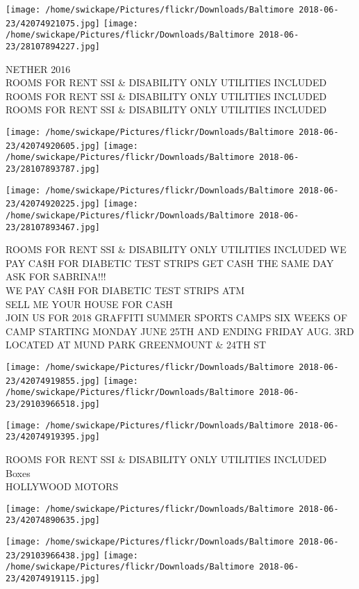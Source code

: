 \documentclass[10pt,letterpaper]{article}
\begin{document}
\texttt{[image: /home/swickape/Pictures/flickr/Downloads/Baltimore 2018-06-23/42074921075.jpg]}
\texttt{[image: /home/swickape/Pictures/flickr/Downloads/Baltimore 2018-06-23/28107894227.jpg]}

NETHER 2016\\
ROOMS FOR RENT SSI \& DISABILITY ONLY UTILITIES INCLUDED\\
ROOMS FOR RENT SSI \& DISABILITY ONLY UTILITIES INCLUDED\\
ROOMS FOR RENT SSI \& DISABILITY ONLY UTILITIES INCLUDED
\pagebreak

\texttt{[image: /home/swickape/Pictures/flickr/Downloads/Baltimore 2018-06-23/42074920605.jpg]}
\texttt{[image: /home/swickape/Pictures/flickr/Downloads/Baltimore 2018-06-23/28107893787.jpg]}

\texttt{[image: /home/swickape/Pictures/flickr/Downloads/Baltimore 2018-06-23/42074920225.jpg]}
\texttt{[image: /home/swickape/Pictures/flickr/Downloads/Baltimore 2018-06-23/28107893467.jpg]}

ROOMS FOR RENT SSI \& DISABILITY ONLY UTILITIES INCLUDED WE PAY CA\$H FOR DIABETIC TEST STRIPS GET CASH THE SAME DAY ASK FOR SABRINA!!!\\
WE PAY CA\$H FOR DIABETIC TEST STRIPS ATM\\
SELL ME YOUR HOUSE FOR CASH\\
JOIN US FOR 2018 GRAFFITI SUMMER SPORTS CAMPS SIX WEEKS OF CAMP STARTING MONDAY JUNE 25TH AND ENDING FRIDAY AUG. 3RD LOCATED AT MUND PARK GREENMOUNT \& 24TH ST
\pagebreak

\texttt{[image: /home/swickape/Pictures/flickr/Downloads/Baltimore 2018-06-23/42074919855.jpg]}
\texttt{[image: /home/swickape/Pictures/flickr/Downloads/Baltimore 2018-06-23/29103966518.jpg]}

\texttt{[image: /home/swickape/Pictures/flickr/Downloads/Baltimore 2018-06-23/42074919395.jpg]}

ROOMS FOR RENT SSI \& DISABILITY ONLY UTILITIES INCLUDED\\
Boxes\\
HOLLYWOOD MOTORS
\pagebreak

\texttt{[image: /home/swickape/Pictures/flickr/Downloads/Baltimore 2018-06-23/42074890635.jpg]}

\vspace{0.25in}
\texttt{[image: /home/swickape/Pictures/flickr/Downloads/Baltimore 2018-06-23/29103966438.jpg]}
\texttt{[image: /home/swickape/Pictures/flickr/Downloads/Baltimore 2018-06-23/42074919115.jpg]}
\end{document}
